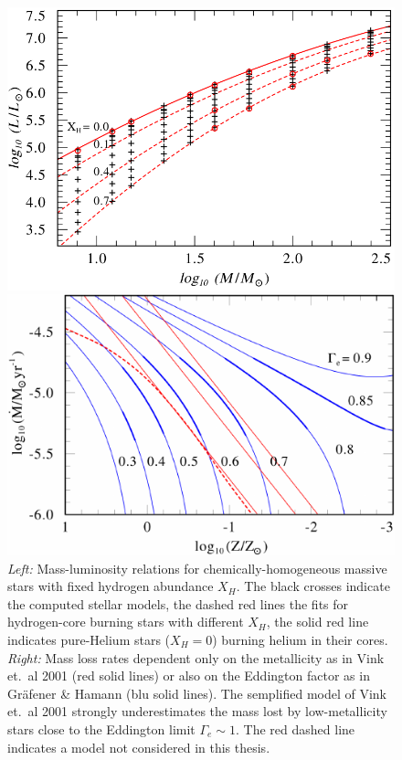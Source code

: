\documentclass[a4paper,titlepage]{book}     	%
\begin{document}
 
\begin{figure}[h]
	\begin{minipage}{.49\textwidth}
		\centering
		\includegraphics[width=.94\textwidth]{./images/MLrelation.png}
	\end{minipage}
	\hfill
	\begin{minipage}{.49\textwidth}
		\centering
		\includegraphics[width=\textwidth]{./images/stellarwinds.pdf}	
	\end{minipage}
	\caption{\emph{Left:} Mass-luminosity relations for chemically-homogeneous massive stars with fixed hydrogen abundance $X_H$. The black crosses indicate the computed stellar models, the dashed red lines the fits for hydrogen-core burning stars with different $X_H$, the solid red line indicates pure-Helium stars ($X_H = 0$) burning helium in their cores. \cite{Grafener2011_M-L_WR} \emph{Right:} Mass loss rates dependent only on the metallicity as in Vink et.\ al 2001 \cite{Vink2001} (red solid lines) or also on the Eddington factor as in Gr{\"a}fener \& Hamann \cite{G&H_WRmassloss} (blu solid lines). The semplified model of Vink et.\ al 2001 strongly underestimates the mass lost by low-metallicity stars close to the Eddington limit $\Gamma_e \sim 1$. The red dashed line indicates a model not considered in this thesis. \cite{G&H_WRmassloss}}\label{fig:MLandwinds}
\end{figure}
\end{document}

